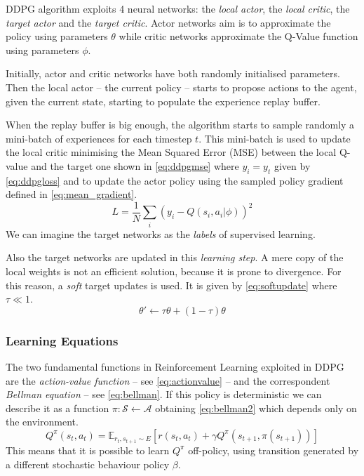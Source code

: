 DDPG algorithm exploits 4 neural networks: the \textit{local actor}, the \textit{local critic}, the \textit{target actor} and the \textit{target critic}. Actor networks aim is to approximate the policy using parameters $\theta$ while critic networks approximate the Q-Value function using parameters $\phi$.

Initially, actor and critic networks have both randomly initialised parameters. Then the local actor -- the current policy -- starts to propose actions to the agent, given the current state, starting to populate the experience replay buffer.

When the replay buffer is big enough, the algorithm starts to sample randomly a mini-batch of experiences for each timestep $t$. This mini-batch is used to update the local critic minimising the Mean Squared Error (MSE) between the local Q-value and the target one shown in \vref{eq:ddpgmse} where $y_i = y_t$ given by \vref{eq:ddpgloss} and to update the actor policy using the sampled policy gradient defined in \vref{eq:mean_gradient}.
\begin{equation}\label{eq:ddpgmse}
L = \frac{1}{N} \sum_i(y_i -Q(s_i, a_i|\phi))^2
\end{equation}
We can imagine the target networks as the \textit{labels} of supervised learning.

Also the target networks are updated in this \textit{learning step}. A mere copy of the local weights is not an efficient solution, because it is prone to divergence. For this reason, a \textit{soft} target updates is used. It is given by \vref{eq:softupdate} where $\tau \ll 1$.
\begin{equation} \label{eq:softupdate}
\theta' \leftarrow \tau \theta + (1-\tau)\theta
\end{equation}


\subsubsection{Learning Equations}

The two fundamental functions in Reinforcement Learning exploited in DDPG are the \textit{action-value function} -- see \vref{eq:actionvalue} -- and the correspondent \textit{Bellman equation} -- see \vref{eq:bellman}.
If this policy is deterministic we can describe it as a function $ \pi : \mathcal{S} \leftarrow \mathcal{A}$ obtaining \vref{eq:bellman2} which depends only on the environment.
\begin{equation}\label{eq:bellman2}
Q^\pi(s_t, a_t) = \mathbb{E}_{r_t,s_{t+1}\sim \mathit{E}}[r(s_t, a_t) + \gamma Q^\pi(s_{t+1}, \pi(s_{t+1}))]
\end{equation}
This means that it is possible to learn $Q^\pi$ off-policy, using transition generated by a different stochastic behaviour policy $\beta$.

